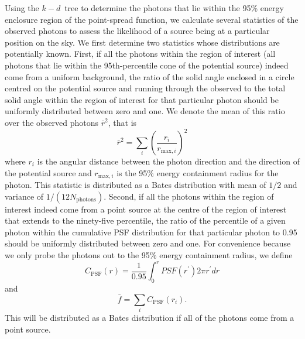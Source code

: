 \documentclass[useAMS,usenatbib]{mn2e}
\begin{document}
Using the $k-d$~tree to determine the photons that lie within the 95\%
energy enclosure region of the point-spread function, we calculate several
statistics of the observed photons to assess the likelihood of a
source being at a particular position on the sky.  We first determine
two statistics whose distributions are potentially known. First, if
all the photons within the region of interest (all photons that lie
within the 95th-percentile cone of the potential source) indeed come
from a uniform background, the ratio of the solid angle enclosed in a
circle centred on the potential source and running through the
observed to the total solid angle within the region of interest for
that particular photon should be uniformly distributed between zero
and one.  We denote the mean of this ratio over the observed photons
$\bar r^2$, that is
\begin{equation}
  \bar r^2 = \sum_i \left ( \frac{r_i}{r_{\mathrm{max},i}} \right )^2 
\end{equation}
where $r_i$ is the angular distance between the photon direction and
the direction of the potential source and $r_{\mathrm{max},i}$ is the
95\% energy containment radius for the photon.  This statistic is
distributed as a Bates distribution with mean of $1/2$ and variance of
$1/(12 N_\mathrm{photons})$.  Second, if all the photons within the
region of interest indeed come from a point source at the centre of
the region of interest that extends to the ninety-five percentile, the
ratio of the percentile of a given photon within the cumulative PSF
distribution for that particular photon to 0.95 should be uniformly
distributed between zero and one.  For convenience because we only
probe the photons out to the 95\% energy containment radius, we define
\begin{equation}
  C_\mathrm{PSF} (r) = \frac{1}{0.95} \int_0^r PSF(r^\prime) 2 \pi r^\prime d r
  \label{eq:1}
\end{equation}
and 
\begin{equation}
  \bar f = \sum_i C_\mathrm{PSF} (r_i).
  \label{eq:2}
\end{equation}
This will be distributed as a Bates distribution if all of the photons
come from a point source.
\end{document}

